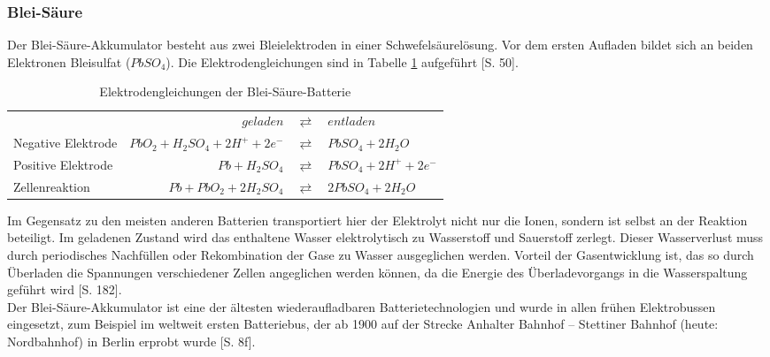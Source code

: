 \subsubsection{Blei-Säure}
Der Blei-Säure-Akkumulator besteht aus zwei Bleielektroden in einer Schwefelsäurelösung. Vor dem ersten Aufladen bildet sich an beiden Elektronen Bleisulfat ($PbSO_4$). Die Elektrodengleichungen sind in Tabelle \ref{Pb} aufgeführt \cite{KiehneBattery}[S. 50].\\
\begin{table}\centering
  \begin{tabularx}{\linewidth}{XrcX}
  	                   &                       $geladen$ & $\rightleftarrows$ & $entladen$             \\
  	Negative Elektrode & $PbO_2 + H_2SO_4 + 2H^+ + 2e^-$ & $\rightleftarrows$ & $PbSO_4 + 2H_2O$       \\
  	Positive Elektrode &                  $Pb + H_2SO_4$ & $\rightleftarrows$ & $PbSO_4 + 2H^+ + 2e^-$ \\ \midrule
  	Zellenreaktion     &         $Pb + PbO_2 + 2H_2SO_4$ & $\rightleftarrows$ & $2PbSO_4 + 2H_2O$      \\
  \end{tabularx}
  \caption{Elektrodengleichungen der Blei-Säure-Batterie}
  \label{Pb}
\end{table}
Im Gegensatz zu den meisten anderen Batterien transportiert hier der Elektrolyt nicht nur die Ionen, sondern ist selbst an der Reaktion beteiligt. Im geladenen Zustand wird das enthaltene Wasser elektrolytisch zu Wasserstoff und Sauerstoff zerlegt. Dieser Wasserverlust muss durch periodisches Nachfüllen oder Rekombination der Gase zu Wasser ausgeglichen werden. Vorteil der Gasentwicklung ist, das so durch Überladen die Spannungen verschiedener Zellen angeglichen werden können, da die Energie des Überladevorgangs in die Wasserspaltung geführt wird \cite{tub_aleph001746639}[S. 182].\\
Der Blei-Säure-Akkumulator ist eine der ältesten wiederaufladbaren Batterietechnologien und wurde in allen frühen Elektrobussen eingesetzt, zum Beispiel im weltweit ersten Batteriebus, der ab 1900 auf der Strecke Anhalter Bahnhof – Stettiner Bahnhof (heute: Nordbahnhof) in Berlin erprobt wurde \cite{Risch:1957}[S. 8f].

